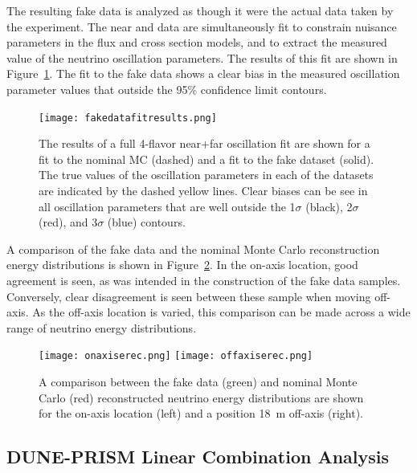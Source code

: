 The resulting fake data is analyzed as though it were the actual data taken by the experiment. The near and   data are simultaneously fit to constrain nuisance parameters in the flux and cross section models, and to extract the measured value of the neutrino oscillation parameters. The results of this fit are shown in Figure~\ref{fig:duneprismfit}. The fit to the fake data shows a clear bias in the measured oscillation parameter values that outside the 95\% confidence limit contours.

\begin{figure}[h!]
   \begin{center}
      \texttt{[image: fakedatafitresults.png]}
      \caption{The results of a full 4-flavor near+far oscillation fit are shown for a fit to the nominal MC (dashed) and a fit to the fake dataset (solid). The true values of the oscillation parameters in each of the datasets are indicated by the dashed yellow lines. Clear biases can be see in all oscillation parameters that are well outside the 1$\sigma$ (black), 2$\sigma$ (red), and 3$\sigma$ (blue) contours.}
      \label{fig:duneprismfit}
   \end{center}
\end{figure}

A comparison of the fake data and the nominal Monte Carlo reconstruction energy distributions is shown in Figure~\ref{fig:duneprismerec}. In the on-axis location, good agreement is seen, as was intended in the construction of the fake data samples. Conversely, clear disagreement is seen between these sample when moving off-axis. As the off-axis location is varied, this comparison can be made across a wide range of neutrino energy distributions.

\begin{figure}[h!]
   \begin{center}
      \texttt{[image: onaxiserec.png]}
      \texttt{[image: offaxiserec.png]}
      \caption{A comparison between the fake data (green) and nominal Monte Carlo (red) reconstructed neutrino energy distributions are shown for the on-axis   location (left) and a position 18~m off-axis (right).}
      \label{fig:duneprismerec}
   \end{center}
\end{figure}

\subsection{DUNE-PRISM Linear Combination Analysis}

